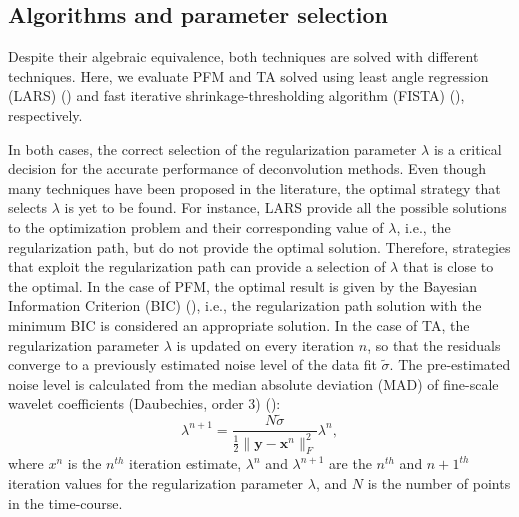 \subsection{Algorithms and parameter selection}
\label{sec:regparam}
Despite their algebraic equivalence, both techniques are solved with different techniques. Here, we evaluate PFM and TA solved using least angle regression (LARS) (\citealt{efron2004LeastAngleRegression}) and fast iterative shrinkage-thresholding algorithm (FISTA) (\citealt{beck2009FastIterativeShrinkagethresholding}), respectively.

In both cases, the correct selection of the regularization parameter $\lambda$ is a critical decision for the accurate performance of deconvolution methods. Even though many techniques have been proposed in the literature, the optimal strategy that selects $\lambda$ is yet to be found. For instance, LARS provide all the possible solutions to the optimization problem and their corresponding value of $\lambda$, i.e., the regularization path, but do not provide the optimal solution. Therefore, strategies that exploit the regularization path can provide a selection of $\lambda$ that is close to the optimal. In the case of PFM, the optimal result is given by the Bayesian Information Criterion (BIC) (\citealt{schwarz1978EstimatingDimensionModel}), i.e., the regularization path solution with the minimum BIC is considered an appropriate solution. In the case of TA, the regularization parameter $\lambda$ is updated on every iteration $n$, so that the residuals converge to a previously estimated noise level of the data fit $\tilde{\sigma}$. The pre-estimated noise level is calculated from the median absolute deviation (MAD) of fine-scale wavelet coefficients (Daubechies, order 3) (\citealt{karahanoglu2013TotalActivationfMRI}):
\begin{equation}
    \lambda^{n+1} = \frac{N \tilde{\sigma}}{\frac{1}{2} \| \mathbf{y} - \mathbf{x}^n \|_F^2} \lambda^n,
\label{eq:std}
\end{equation}
where $x^n$ is the $n^{th}$ iteration estimate, $\lambda^n$ and $\lambda^{n+1}$ are the $n^{th}$ and $n+1^{th}$ iteration values for the regularization parameter $\lambda$, and $N$ is the number of points in the time-course.

